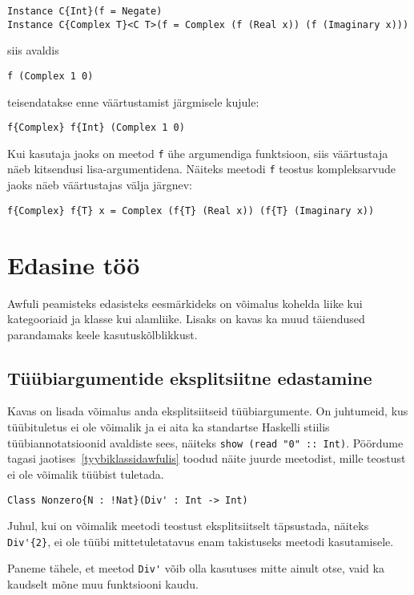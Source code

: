 \documentclass[12pt]{article}
\newcommand\peatykk[1]{
  \clearpage
  \section{#1}}
\begin{document}
        \begin{verbatim}Instance C{Int}(f = Negate)
Instance C{Complex T}<C T>(f = Complex (f (Real x)) (f (Imaginary x)))\end{verbatim}

        siis avaldis

        \begin{verbatim}f (Complex 1 0)\end{verbatim}

        teisendatakse enne väärtustamist järgmisele kujule:

        \begin{verbatim}f{Complex} f{Int} (Complex 1 0)\end{verbatim}

        Kui kasutaja jaoks on meetod \verb!f! ühe argumendiga funktsioon, siis väärtustaja näeb kitsendusi lisa-argumentidena. Näiteks meetodi \verb!f! teostus kompleksarvude jaoks näeb väärtustajas välja järgnev:

        \begin{verbatim}f{Complex} f{T} x = Complex (f{T} (Real x)) (f{T} (Imaginary x))\end{verbatim}
  \peatykk{Edasine töö}
    Awfuli peamisteks edasisteks eesmärkideks on võimalus kohelda liike kui kategooriaid ja klasse kui alamliike. Lisaks on kavas ka muud täiendused parandamaks keele kasutuskõlblikkust.
    \subsection{Tüübiargumentide eksplitsiitne edastamine}
      Kavas on lisada võimalus anda eksplitsiitseid tüübiargumente. On juhtumeid, kus tüübituletus ei ole võimalik ja ei aita ka standartse Haskelli stiilis tüübiannotatsioonid avaldiste sees, näiteks \verb!show (read "0" :: Int)!. Pöördume tagasi jaotises~\ref{tyybiklassidawfulis} toodud näite juurde meetodist, mille teostust ei ole võimalik tüübist tuletada.

      \begin{verbatim}Class Nonzero{N : !Nat}(Div' : Int -> Int)\end{verbatim}

      Juhul, kui on võimalik meetodi teostust eksplitsiitselt täpsustada, näiteks \verb!Div'{2}!, ei ole tüübi mittetuletatavus enam takistuseks meetodi kasutamisele.

      Paneme tähele, et meetod \verb!Div'! võib olla kasutuses mitte ainult otse, vaid ka kaudselt mõne muu funktsiooni kaudu.
\end{document}
